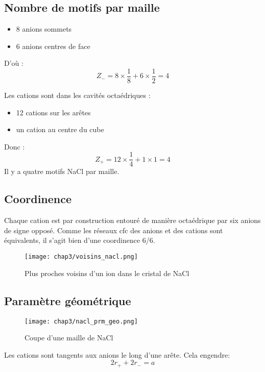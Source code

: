 \subsection{Nombre de motifs par maille}
\begin{itemize}
    \item 8 anions sommets
    \item 6 anions centres de face
\end{itemize}
D'où :
\begin{equation}
    Z_- = 8 \times \frac{1}{8} + 6 \times \frac{1}{2} = 4
\end{equation}


Les cations sont dans les cavités octaédriques  :
\begin{itemize}
    \item 12 cations sur les arêtes
    \item un cation au centre du cube
\end{itemize}
Donc :
\begin{equation}
    Z_+ = 12 \times \frac{1}{4} + 1 \times 1 = 4
\end{equation}
Il y a quatre motifs NaCl par maille.


\subsection{Coordinence}
Chaque cation est par construction entouré de manière octaédrique par six anions
de signe opposé. Comme les réseaux cfc des anions et des cations sont équivalents, il
s'agit bien d’une coordinence 6/6.
\begin{figure}
    \centering
    \texttt{[image: chap3/voisins\_nacl.png]}
    \caption{Plus proches voisins d'un ion dans le cristal de NaCl}
    \label{fig:3_nacl_voisins}
\end{figure}


\subsection{Paramètre géométrique}
\begin{figure}
    \centering
    \texttt{[image: chap3/nacl\_prm\_geo.png]}
    \caption{Coupe d'une maille de NaCl}\label{fig:3_nacl_maille_coupe}
\end{figure}
Les cations sont tangents aux anions le long d'une arête. Cela engendre:
\begin{equation}
    2r_+ + 2r_- = a
    \label{eq:3_nacl_ar}
\end{equation}



